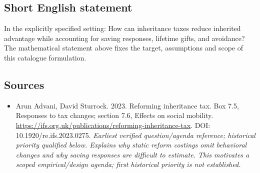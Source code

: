 \documentclass[11pt]{article}
\begin{document}
\subsection{Short English statement}
In the explicitly specified setting: How can inheritance taxes reduce inherited advantage while accounting for saving responses, lifetime gifts, and avoidance? The mathematical statement above fixes the target, assumptions and scope of this catalogue formulation.

\subsection{Sources}
\begin{itemize}\raggedright
\item[\textnormal{[S1]}]\hypertarget{source:30007755:1}{} Arun Advani, David Sturrock. 2023. Reforming inheritance tax. Box 7.5, Responses to tax changes; section 7.6, Effects on social mobility.
\url{https://ifs.org.uk/publications/reforming-inheritance-tax}.
DOI: 10.1920/re.ifs.2023.0275.
{\small\textit{Earliest verified question/agenda reference; historical priority qualified below. Explains why static reform costings omit behavioral changes and why saving responses are difficult to estimate. This motivates a scoped empirical/design agenda; first historical priority is not established.}}
\end{itemize}
\end{document}
